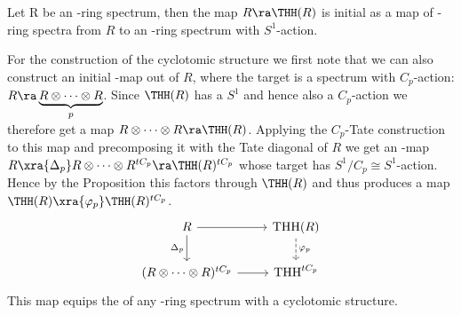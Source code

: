 \begin{prop}
Let R be an \Einf-ring spectrum, then the map $R\ra \THH(R)$ is initial as a map of \Einf-ring spectra from $R$ to an \Einf-ring spectrum with $S^1$-action.
\end{prop}
For the construction of the cyclotomic structure we first note that we can also construct an initial \Einf-map out of $R$, where the target is a spectrum with $C_p$-action: $R\ra \underbrace{R\otimes\dots\otimes R}_{p}$.
Since $\THH(R)$ has a $S^1$ and hence also a $C_p$-action we therefore get a map $R\otimes\dots\otimes R\ra \THH(R)$. Applying the $C_p$-Tate construction to this map and precomposing it with the Tate diagonal of $R$ we get an \Einf-map $R\xra{\Delta_p} R\otimes\dots\otimes R^{tC_p}\ra \THH(R)^{tC_p}$ whose target has $S^1/C_p\cong S^1$-action.
\newline
Hence by the Proposition this factors through $\THH(R)$ and thus produces a map $\THH(R)\xra{\varphi_p} \THH(R)^{tC_p}$.
\[\begin{tikzcd}
	{R} & {\text{THH}(R)} \\
	{(R\otimes\dots\otimes R)^{tC_p}} & {\text{THH}^{tC_p}}
	\arrow[from=1-1, to=1-2]
	\arrow["{\varphi_p}", from=1-2, to=2-2, dashed]
	\arrow["{\Delta_p}"', from=1-1, to=2-1]
	\arrow[from=2-1, to=2-2]
\end{tikzcd}\]
This map equips the \thh  of any \Einf-ring spectrum with a cyclotomic structure.